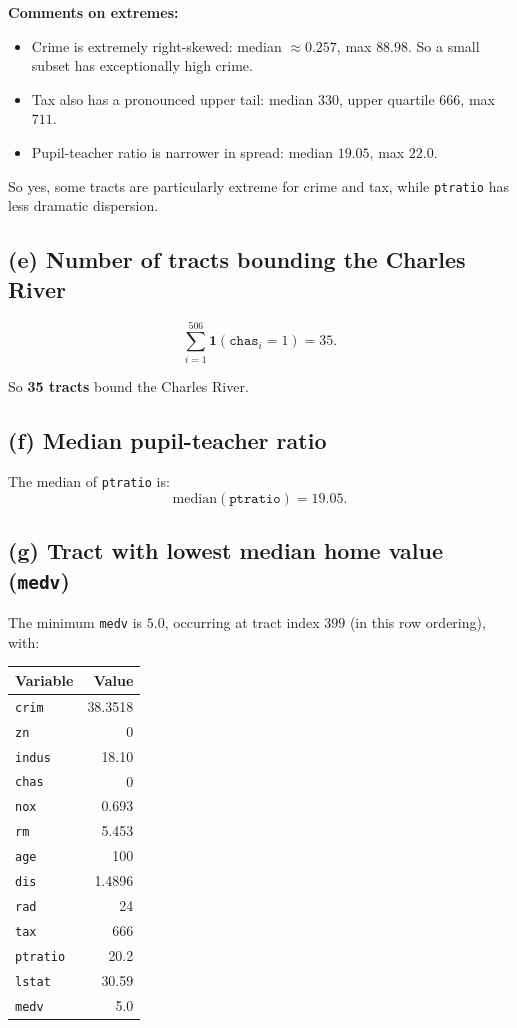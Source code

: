 \documentclass[12pt]{article}
\begin{document}
\textbf{Comments on extremes:}
\begin{itemize}
\item Crime is extremely right-skewed: median $\approx 0.257$, max $88.98$. So a small subset has exceptionally high crime.
\item Tax also has a pronounced upper tail: median $330$, upper quartile $666$, max $711$.
\item Pupil-teacher ratio is narrower in spread: median $19.05$, max $22.0$.
\end{itemize}

So yes, some tracts are particularly extreme for crime and tax, while \texttt{ptratio} has less dramatic dispersion.

\subsection*{(e) Number of tracts bounding the Charles River}
\[
\sum_{i=1}^{506} \mathbf{1}(\texttt{chas}_i = 1) = 35.
\]

So \textbf{35 tracts} bound the Charles River.

\subsection*{(f) Median pupil-teacher ratio}
The median of \texttt{ptratio} is:
\[
\mathrm{median}(\texttt{ptratio}) = 19.05.
\]

\subsection*{(g) Tract with lowest median home value (\texttt{medv})}
The minimum \texttt{medv} is $5.0$, occurring at tract index $399$ (in this row ordering), with:
\begin{center}
\begin{tabular}{lr}
\toprule
Variable & Value \\
\midrule
\texttt{crim} & 38.3518 \\
\texttt{zn} & 0 \\
\texttt{indus} & 18.10 \\
\texttt{chas} & 0 \\
\texttt{nox} & 0.693 \\
\texttt{rm} & 5.453 \\
\texttt{age} & 100 \\
\texttt{dis} & 1.4896 \\
\texttt{rad} & 24 \\
\texttt{tax} & 666 \\
\texttt{ptratio} & 20.2 \\
\texttt{lstat} & 30.59 \\
\texttt{medv} & 5.0 \\
\bottomrule
\end{tabular}
\end{center}
\end{document}
